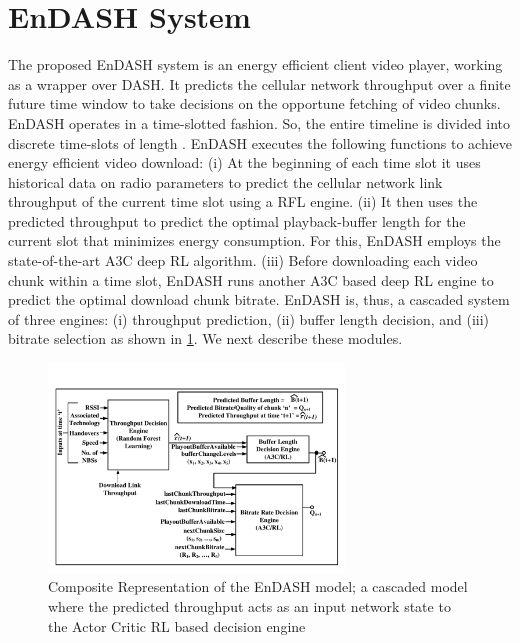 \section{EnDASH System}\label{sec:chap04:sys_overview}
The proposed EnDASH system is an energy efficient client video player, working as a wrapper over \ac{DASH}. It predicts the cellular network throughput over a finite future time window to take decisions on the opportune fetching of  video chunks.  EnDASH operates in a time-slotted fashion. So, the entire timeline is divided into discrete time-slots of length .
EnDASH executes the following functions to achieve energy efficient video download: (i) At the beginning of each time slot it uses historical data on radio parameters to predict the cellular network link throughput of the current time slot using a \ac{RFL} engine. (ii) It then uses the predicted throughput to predict the optimal playback-buffer length for the current slot that minimizes energy consumption. For this, EnDASH employs the state-of-the-art \ac{A3C} deep \ac{RL} algorithm.  (iii) Before downloading each video chunk within a time slot, EnDASH runs another A3C based deep \ac{RL} engine to predict the optimal download chunk  bitrate.
EnDASH is, thus, a cascaded system of three engines: (i) throughput prediction, (ii) buffer length decision,  and (iii) bitrate selection as shown in \fig\ref{fig:chap04:EnDASH system}. We next describe these modules.
 \begin{figure}[t]
	\centering
	\includegraphics[width = 0.7\textwidth,trim = {1cm 1cm 1cm 1cm}]{figures/EnDASH_system.pdf}
	\caption{Composite Representation of the EnDASH model; a cascaded model where the predicted throughput acts as an input network state to the Actor Critic \acs{RL} based decision engine}
	\label{fig:chap04:EnDASH system}
\end{figure}

